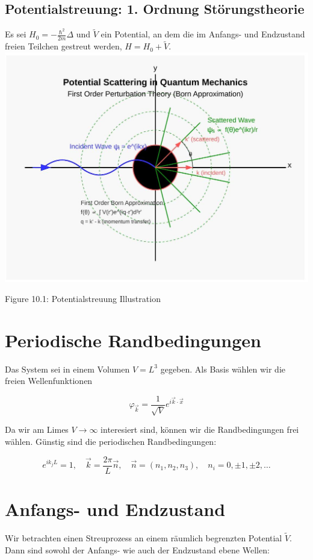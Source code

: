 \documentclass[10pt, letterpaper]{article}
\begin{document}
\subsection*{Potentialstreuung: 1. Ordnung Störungstheorie}
Es sei $H_{0}=-\frac{\hbar^{2}}{2 m} \Delta$ und $\tilde{V}$ ein Potential, an dem die im Anfangs- und Endzustand freien Teilchen gestreut werden, $H=H_{0}+\tilde{V}$.\\
\includegraphics[max width=\textwidth, center]{2025_06_07_f7019c98c95e0473d81eg-10}

Figure 10.1: Potentialstreuung Illustration

\section*{Periodische Randbedingungen}
Das System sei in einem Volumen $V=L^{3}$ gegeben. Als Basis wählen wir die freien Wellenfunktionen

$$
\varphi_{\vec{k}}=\frac{1}{\sqrt{V}} e^{i \vec{k} \cdot \vec{x}}
$$

Da wir am Limes $V \rightarrow \infty$ interesiert sind, können wir die Randbedingungen frei wählen. Günstig sind die periodischen Randbedingungen:

$$
e^{i k_{j} L}=1, \quad \vec{k}=\frac{2 \pi}{L} \vec{n}, \quad \vec{n}=\left(n_{1}, n_{2}, n_{3}\right), \quad n_{i}=0, \pm 1, \pm 2, \ldots
$$

\section*{Anfangs- und Endzustand}
Wir betrachten einen Streuprozess an einem räumlich begrenzten Potential $\tilde{V}$. Dann sind sowohl der Anfangs- wie auch der Endzustand ebene Wellen:
\end{document}
